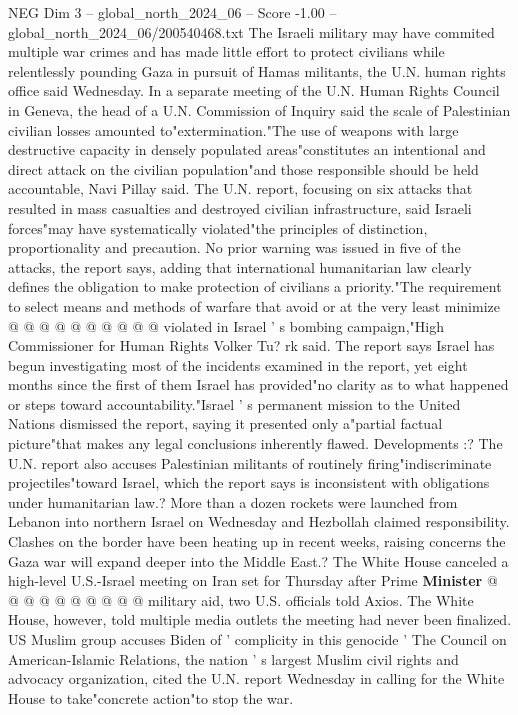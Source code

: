 \begin{textsample}{NEG Dim 3 – global\_north\_2024\_06 – Score -1.00 – global\_north\_2024\_06/200540468.txt}  \label{ex:f3_neg_393}
The Israeli military may have commited multiple war crimes and has made little effort to protect civilians while relentlessly pounding Gaza in pursuit of Hamas militants, the U.N. human rights office said Wednesday.
In a separate meeting of the U.N.
Human Rights Council in Geneva, the head of a U.N.
Commission of Inquiry said the scale of Palestinian civilian losses amounted to"extermination."The use of weapons with large destructive capacity in densely populated areas"constitutes an intentional and direct attack on the civilian population"and those responsible should be held accountable, Navi Pillay said.
The U.N. report, focusing on six attacks that resulted in mass casualties and destroyed civilian infrastructure, said Israeli forces"may have systematically violated"the principles of distinction, proportionality and precaution.
No prior warning was issued in five of the attacks, the report says, adding that international humanitarian law clearly defines the obligation to make protection of civilians a priority."The requirement to select means and methods of warfare that avoid or at the very least minimize @ @ @ @ @ @ @ @ @ @ violated in Israel ' s bombing campaign,"High Commissioner for Human Rights Volker Tu? rk said.
The report says Israel has begun investigating most of the incidents examined in the report, yet eight months since the first of them Israel has provided"no clarity as to what happened or steps toward accountability."Israel ' s permanent mission to the United Nations dismissed the report, saying it presented only a"partial factual picture"that makes any legal conclusions inherently flawed.
Developments :?
The U.N. report also accuses Palestinian militants of routinely firing"indiscriminate projectiles"toward Israel, which the report says is inconsistent with obligations under humanitarian law.?
More than a dozen rockets were launched from Lebanon into northern Israel on Wednesday and Hezbollah claimed responsibility.
Clashes on the border have been heating up in recent weeks, raising concerns the Gaza war will expand deeper into the Middle East.?
The White House canceled a high-level U.S.-Israel meeting on Iran set for Thursday after Prime \textbf{Minister} @ @ @ @ @ @ @ @ @ @ military aid, two U.S. officials told Axios.
The White House, however, told multiple media outlets the meeting had never been finalized.
US Muslim group accuses Biden of ' complicity in this genocide ' The Council on American-Islamic Relations, the nation ' s largest Muslim civil rights and advocacy organization, cited the U.N. report Wednesday in calling for the White House to take"concrete action"to stop the war.

\end{textsample}
